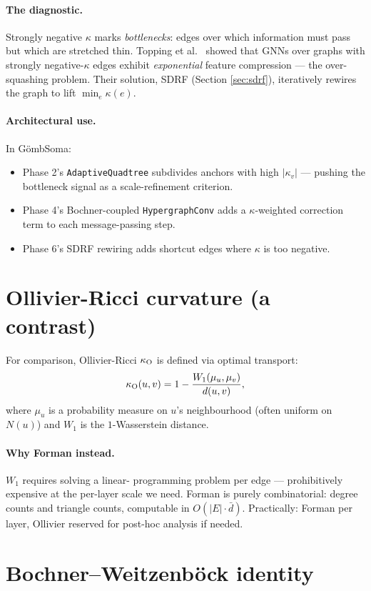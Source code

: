 \documentclass[11pt,a4paper]{article}
\begin{document}
\paragraph{The diagnostic.} Strongly negative $\kappa$ marks
\emph{bottlenecks}: edges over which information must pass but which
are stretched thin. Topping et al.\ \cite{Topping2022} showed that
GNNs over graphs with strongly negative-$\kappa$ edges exhibit
\emph{exponential} feature compression --- the over-squashing problem.
Their solution, SDRF (Section \ref{sec:sdrf}), iteratively rewires the
graph to lift $\min_e \kappa(e)$.

\paragraph{Architectural use.} In G\"ombSoma:
\begin{itemize}
\item Phase 2's \texttt{AdaptiveQuadtree} subdivides anchors with
  high $|\kappa_v|$ --- pushing the bottleneck signal as a
  scale-refinement criterion.
\item Phase 4's Bochner-coupled \texttt{HypergraphConv} adds a
  $\kappa$-weighted correction term to each message-passing step.
\item Phase 6's SDRF rewiring adds shortcut edges where $\kappa$ is
  too negative.
\end{itemize}

\section{Ollivier-Ricci curvature (a contrast)}

For comparison, Ollivier-Ricci $\kappa_{\rm O}$ is defined via
optimal transport:
\[
\kappa_{\rm O}(u, v) = 1 - \frac{W_1(\mu_u, \mu_v)}{d(u, v)},
\]
where $\mu_u$ is a probability measure on $u$'s neighbourhood (often
uniform on $N(u)$) and $W_1$ is the $1$-Wasserstein distance.

\paragraph{Why Forman instead.} $W_1$ requires solving a linear-
programming problem per edge --- prohibitively expensive at the
per-layer scale we need. Forman is purely combinatorial: degree
counts and triangle counts, computable in $O(|E| \cdot \bar d)$.
Practically: Forman per layer, Ollivier reserved for post-hoc
analysis if needed.

\section{Bochner--Weitzenböck identity}
\end{document}
